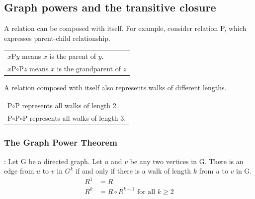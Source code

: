 \begin{center}
\end{center}

\subsection{Graph powers and the transitive closure}

A relation can be composed with itself. For example, consider relation P, which expresses parent-child relationship.
\begin{center}
  \begin{tabular}{l}
    $x$P$y$ means $x$ is the parent of $y$. \\
    $x$P$\circ$P$z$ means $x$ is the grandparent of $z$
  \end{tabular}
\end{center}
A relation composed with itself also represents walks of different lengths.
\begin{center}
  \begin{tabular}{l}
    P$\circ$P represents all walks of length 2. \\
    P$\circ$P$\circ$P represents all walks of length 3.
  \end{tabular}
\end{center}

\subsubsection*{The Graph Power Theorem}:
Let G be a directed graph. Let $u$ and $v$ be any two vertices in G. There is an edge from $u$ to $v$ in $G^k$
if and only if there is a walk of length $k$ from $u$ to $v$ in G.
\begin{align*}
  R^1 & = R                                         \\
  R^k & = R \circ R^{k-1} \text{ for all } k \geq 2
\end{align*}

